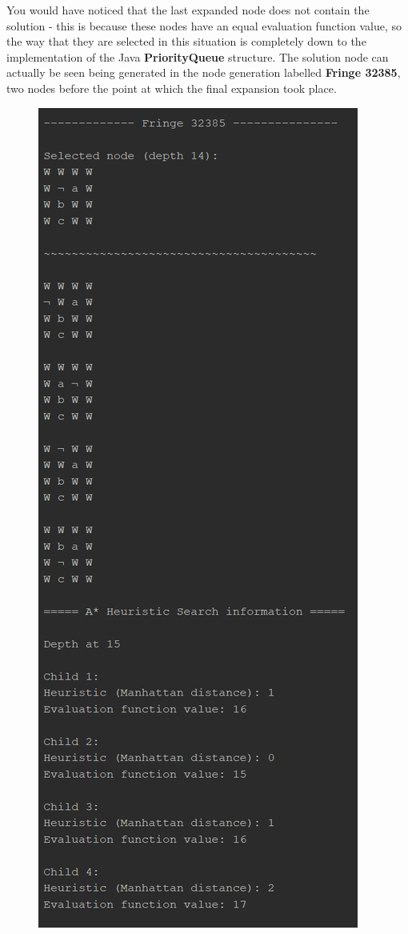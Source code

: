 \documentclass{article}
\begin{document}
	\newpage
	You would have noticed that the last expanded node does not contain the solution - this is because these nodes have an equal evaluation function value, so the way that they are selected in this situation is completely down to the implementation of the Java \textbf{PriorityQueue} structure. The solution node can actually be seen being generated in the node generation labelled \textbf{Fringe 32385}, two nodes before the point at which the final expansion took place.
	\begin{figure}[h]
		\centering
		\includegraphics[height=0.75\textheight]{AStar-2-4.png}
	\end{figure}
\end{document}
